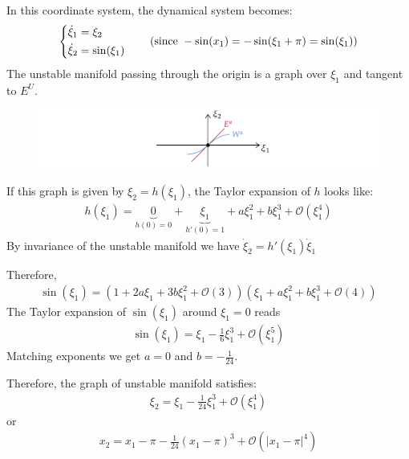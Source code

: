 \begin{solution}[4.2]
In this coordinate system, the dynamical system becomes:
\begin{align}
	\begin{dcases}
		\dot{\xi}_1 = \xi_2 \\
		\dot{\xi}_2 = \sin(\xi_1)
	\end{dcases} \qquad (\text{since } -\sin(x_1) = -\sin(\xi_1 + \pi) = \sin(\xi_1))
\end{align}
The unstable manifold passing through the origin is a graph over $\xi_1$ and tangent to $E^U$.
\begin{figure}[h]
	\centering
	\includegraphics[scale=0.9]{figures/solutions/ch4/S02D03.pdf}
\end{figure}
If this graph is given by $\xi_2 = h(\xi_1)$, the Taylor expansion of $h$ looks like:
\begin{align}
	h(\xi_1) = \underbrace{0}_{h(0)=0} + \underbrace{\xi_1}_{h'(0)=1} + a\xi_1^2 + b\xi_1^3 + \mathcal{O}(\xi_1^4)
\end{align}
By invariance of the unstable manifold we have $\dot{\xi}_2 = h'(\xi_1) \dot{\xi}_1$

Therefore,
\begin{align}
	\sin(\xi_1) = (1 + 2a\xi_1 + 3b\xi_1^2 + \mathcal{O}(3))(\xi_1 + a\xi_1^2 + b\xi_1^3 + \mathcal{O}(4))
\end{align}
The Taylor expansion of $\sin(\xi_1)$ around $\xi_1=0$ reads
\begin{align}
	\sin(\xi_1) = \xi_1 - \frac{1}{6}\xi_1^3 + \mathcal{O}(\xi_1^5)
\end{align}
Matching exponents we get $a = 0$ and $b = -\frac{1}{24}$.

Therefore, the graph of unstable manifold satisfies:
\begin{align}
	\xi_2 = \xi_1 - \frac{1}{24}\xi_1^3 + \mathcal{O}(\xi_1^4)
\end{align}
or
\begin{align}\boxed{
	x_2 = x_1 - \pi -\frac{1}{24}(x_1 - \pi)^3 + \mathcal{O}(|x_1 - \pi|^4)
}\end{align}
\end{solution}

